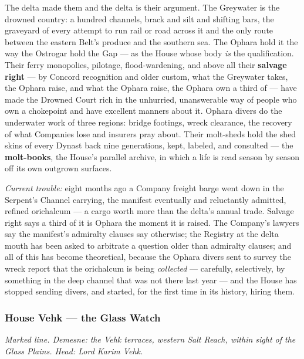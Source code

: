 The delta made them and the delta is their argument. The Greywater is the drowned country: a hundred channels, brack and silt and shifting bars, the graveyard of every attempt to run rail or road across it and the only route between the eastern Belt's produce and the southern sea. The Ophara hold it the way the Ostrogar hold the Gap --- as the House whose body \textit{is} the qualification. Their ferry monopolies, pilotage, flood-wardening, and above all their \textbf{salvage right} --- by Concord recognition and older custom, what the Greywater takes, the Ophara raise, and what the Ophara raise, the Ophara own a third of --- have made the Drowned Court rich in the unhurried, unanswerable way of people who own a chokepoint and have excellent manners about it. Ophara divers do the underwater work of three regions: bridge footings, wreck clearance, the recovery of what Companies lose and insurers pray about. Their molt-sheds hold the shed skins of every Dynast back nine generations, kept, labeled, and consulted --- the \textbf{molt-books}, the House's parallel archive, in which a life is read season by season off its own outgrown surfaces.

\textit{Current trouble:} eight months ago a Company freight barge went down in the Serpent's Channel carrying, the manifest eventually and reluctantly admitted, refined orichalcum --- a cargo worth more than the delta's annual trade. Salvage right says a third of it is Ophara the moment it is raised. The Company's lawyers say the manifest's admiralty clauses say otherwise; the Registry at the delta mouth has been asked to arbitrate a question older than admiralty clauses; and all of this has become theoretical, because the Ophara divers sent to survey the wreck report that the orichalcum is being \textit{collected} --- carefully, selectively, by something in the deep channel that was not there last year --- and the House has stopped sending divers, and started, for the first time in its history, hiring them.

\subsubsection{House Vehk --- the Glass Watch}

\textit{Marked line. Demesne: the Vehk terraces, western Salt Reach, within sight of the Glass Plains. Head: Lord Karim Vehk.}

